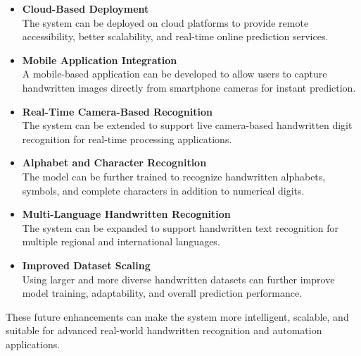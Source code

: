\documentclass[12pt,a4paper]{article}
\begin{document}
\begin{itemize}

\item \textbf{Cloud-Based Deployment} \\
The system can be deployed on cloud platforms to provide remote accessibility, better scalability, and real-time online prediction services.

\vspace{0.2cm}

\item \textbf{Mobile Application Integration} \\
A mobile-based application can be developed to allow users to capture handwritten images directly from smartphone cameras for instant prediction.

\vspace{0.2cm}

\item \textbf{Real-Time Camera-Based Recognition} \\
The system can be extended to support live camera-based handwritten digit recognition for real-time processing applications.

\vspace{0.2cm}

\item \textbf{Alphabet and Character Recognition} \\
The model can be further trained to recognize handwritten alphabets, symbols, and complete characters in addition to numerical digits.


\vspace{0.2cm}

\item \textbf{Multi-Language Handwritten Recognition} \\
The system can be expanded to support handwritten text recognition for multiple regional and international languages.

\vspace{0.2cm}

\item \textbf{Improved Dataset Scaling} \\
Using larger and more diverse handwritten datasets can further improve model training, adaptability, and overall prediction performance.

\end{itemize}

\vspace{0.3cm}

\noindent
These future enhancements can make the system more intelligent, scalable, and suitable for advanced real-world handwritten recognition and automation applications.
\end{document}
